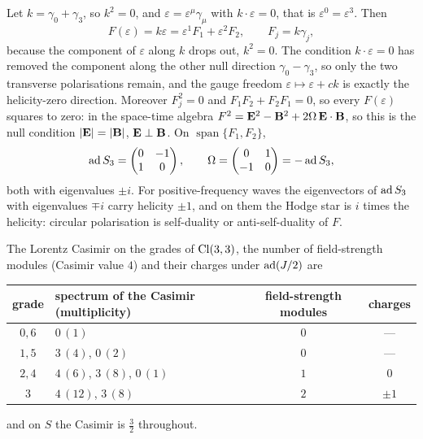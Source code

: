 \begin{example}
\label{ex:univectorwave}
Let $k=\gamma_0+\gamma_3$, so $k^2=0$, and $\varepsilon=\varepsilon^\mu\gamma_\mu$ with $k\cdot\varepsilon=0$, that is $\varepsilon^0=\varepsilon^3$. Then
\[
F(\varepsilon)=k\varepsilon=\varepsilon^1F_1+\varepsilon^2F_2,\qquad F_j=k\gamma_j ,
\]
because the component of $\varepsilon$ along $k$ drops out, $k^2=0$. The condition $k\cdot\varepsilon=0$ has removed the component along the
other null direction $\gamma_0-\gamma_3$, so only the two transverse polarisations remain, and the gauge freedom
$\varepsilon\mapsto\varepsilon+ck$ is exactly the helicity-zero direction. Moreover $F_j^2=0$ and $F_1F_2+F_2F_1=0$, so every $F(\varepsilon)$ squares
to zero: in the space-time algebra $F^2=\mathbf E^2-\mathbf B^2+2\Omega\,\mathbf E\cdot\mathbf B$, so this is the null condition $|\mathbf E|=|\mathbf B|$,
$\mathbf E\perp\mathbf B$. On $\operatorname{span}\{F_1,F_2\}$,
\[
\operatorname{ad} S_3=\begin{pmatrix}0&-1\\1&0\end{pmatrix},\qquad \Omega=\begin{pmatrix}0&1\\-1&0\end{pmatrix}=-\operatorname{ad} S_3 ,
\]
both with eigenvalues $\pm i$. For positive-frequency waves the eigenvectors of $\operatorname{ad} S_3$ with eigenvalues $\mp i$ carry helicity
$\pm1$, and on them the Hodge star is $i$ times the helicity: circular polarisation is self-duality or anti-self-duality of $F$.
\end{example}

\begin{proposition}
\label{prop:censusint}
The Lorentz Casimir on the grades of $\mathrm{Cl}(3,3)$, the number of field-strength modules (Casimir value $4$) and their charges under
$\operatorname{ad}(J/2)$ are
\begin{center}
\begin{tabular}{@{}clcc@{}}
\toprule
grade & spectrum of the Casimir (multiplicity) & field-strength modules & charges\\
\midrule
$0,6$ & $0\,(1)$ & $0$ & ---\\
$1,5$ & $3\,(4)$, $0\,(2)$ & $0$ & ---\\
$2,4$ & $4\,(6)$, $3\,(8)$, $0\,(1)$ & $1$ & $0$\\
$3$ & $4\,(12)$, $3\,(8)$ & $2$ & $\pm1$\\
\bottomrule
\end{tabular}
\end{center}
and on $S$ the Casimir is $\tfrac32$ throughout.
\end{proposition}

